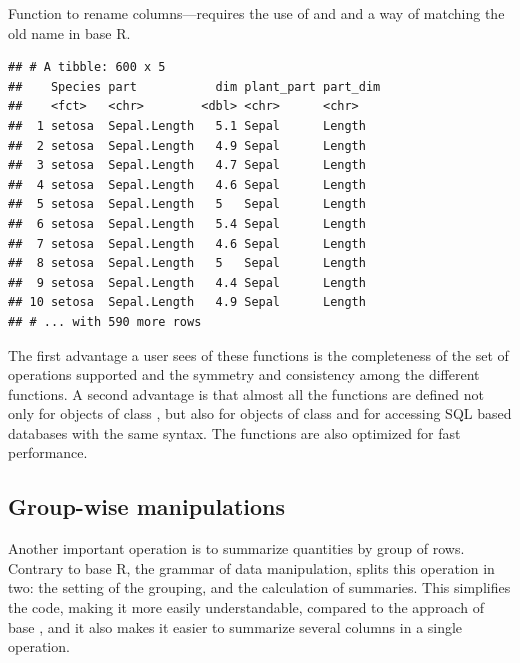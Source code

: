 \documentclass[krantz2]{krantz}\usepackage{knitr}%
\begin{document}
Function  to rename columns---requires the use of  and  and a way of matching the old name in base R.

\begin{knitrout}\footnotesize
{}\color{fgcolor}\begin{kframe}
\begin{alltt}
  
\end{alltt}
\begin{verbatim}
## # A tibble: 600 x 5
##    Species part           dim plant_part part_dim
##    <fct>   <chr>        <dbl> <chr>      <chr>   
##  1 setosa  Sepal.Length   5.1 Sepal      Length  
##  2 setosa  Sepal.Length   4.9 Sepal      Length  
##  3 setosa  Sepal.Length   4.7 Sepal      Length  
##  4 setosa  Sepal.Length   4.6 Sepal      Length  
##  5 setosa  Sepal.Length   5   Sepal      Length  
##  6 setosa  Sepal.Length   5.4 Sepal      Length  
##  7 setosa  Sepal.Length   4.6 Sepal      Length  
##  8 setosa  Sepal.Length   5   Sepal      Length  
##  9 setosa  Sepal.Length   4.4 Sepal      Length  
## 10 setosa  Sepal.Length   4.9 Sepal      Length  
## # ... with 590 more rows
\end{verbatim}
\end{kframe}
\end{knitrout}

The first advantage a user sees of these functions is the completeness of the set of operations supported and the symmetry and consistency among the different functions. A second advantage is that almost all the functions are defined not only for objects of class , but also for objects of class  and for accessing SQL based databases with the same syntax. The functions are also optimized for fast performance.

\subsection{Group-wise manipulations}

Another important operation is to summarize quantities by group of rows. Contrary to base R, the grammar of data manipulation, splits this operation in two: the setting of the grouping, and the calculation of summaries. This simplifies the code, making it more easily understandable, compared to the approach of base \Rlang {}, and it also makes it easier to summarize several columns in a single operation.
\end{document}
